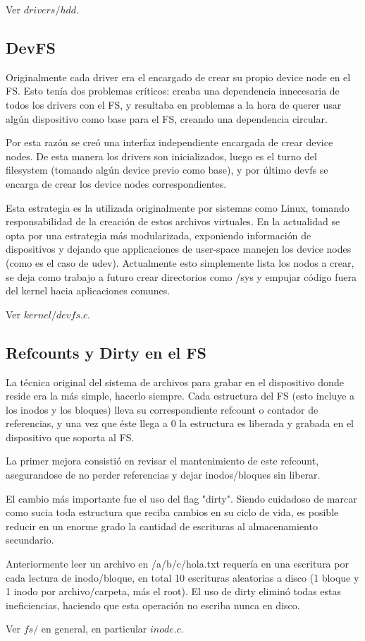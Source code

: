 Ver $drivers/hdd$.

\subsection{DevFS}

Originalmente cada driver era el encargado de crear su propio device node en el
FS. Esto tenía dos problemas críticos: creaba una dependencia innecesaria de todos
los drivers con el FS, y resultaba en problemas a la hora de querer usar algún
dispositivo como base para el FS, creando una dependencia circular.

Por esta razón se creó una interfaz independiente encargada de crear device
nodes. De esta manera los drivers son inicializados, luego es el turno del
filesystem (tomando algún device previo como base), y por último devfs se
encarga de crear los device nodes correspondientes.

Esta estrategia es la utilizada originalmente por sistemas como Linux, tomando
responsabilidad de la creación de estos archivos virtuales. En la actualidad se
opta por una estrategia más modularizada, exponiendo información de dispositivos
y dejando que applicaciones de user-space manejen los device nodes (como es el
caso de udev). Actualmente esto simplemente lista los nodos a crear, se deja como
trabajo a futuro crear directorios como /sys y empujar código fuera del kernel
hacia aplicaciones comunes.

Ver $kernel/devfs.c$.

\subsection{Refcounts y Dirty en el FS}

La técnica original del sistema de archivos para grabar en el dispositivo donde
reside era la más simple, hacerlo siempre. Cada estructura del FS (esto incluye
a los inodos y los bloques) lleva su correspondiente refcount o contador de
referencias, y una vez que éste llega a 0 la estructura es liberada y grabada en
el dispositivo que soporta al FS.

La primer mejora consistió en revisar el mantenimiento de este refcount,
asegurandose de no perder referencias y dejar inodos/bloques sin liberar.

El cambio más importante fue el uso del flag "dirty". Siendo cuidadoso de marcar como
sucia toda estructura que reciba cambios en su ciclo de vida, es posible reducir
en un enorme grado la cantidad de escrituras al almacenamiento secundario.

Anteriormente leer un archivo en /a/b/c/hola.txt requería en
una escritura por cada lectura de inodo/bloque, en total 10 escrituras
aleatorias a disco (1 bloque y 1 inodo por archivo/carpeta, más el root).
El uso de dirty eliminó todas estas ineficiencias, haciendo que esta
operación no escriba nunca en disco.

Ver $fs/$ en general, en particular $inode.c$.
